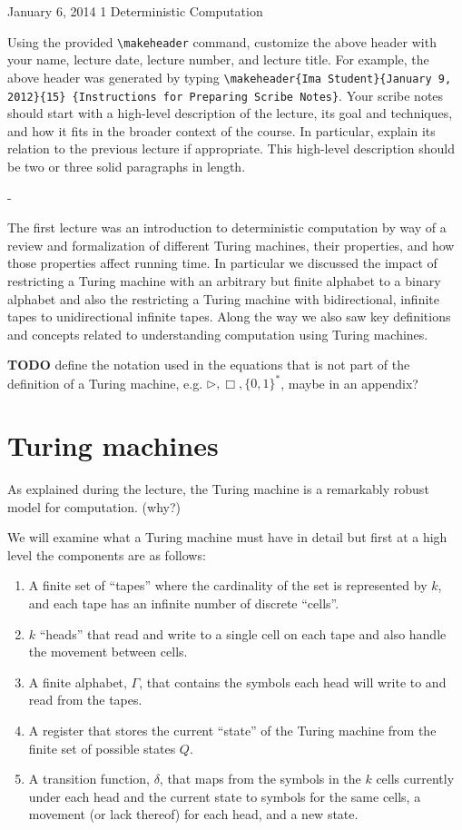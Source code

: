 \documentclass[usletter]{article}
\begin{document}
           {January 6, 2014}           %
           {1}                         %
           {Deterministic Computation} %

\noindent
Using the provided \verb|\makeheader| command,
customize the above header with your name,
lecture date, lecture number, and lecture title. For
example, the above header was generated by typing
\verb|\makeheader{Ima Student}{January 9, 2012}{15}|{\tt
\{Instructions for Preparing Scribe Notes\}}.  Your
scribe notes should start with a high-level description
of the lecture, its goal and techniques, and how it
fits in the broader context of the course. In
particular, explain its relation to the previous
lecture if appropriate.  This high-level description
should be two or three solid paragraphs in length.

-

The first lecture was an introduction to deterministic computation by way of a review and formalization of different Turing machines, their properties, and how those properties affect running time. In particular we discussed the impact of restricting a Turing machine with an arbitrary but finite alphabet to a binary alphabet and also the restricting a Turing machine with bidirectional, infinite tapes to unidirectional infinite tapes. Along the way we also saw key definitions and concepts related to understanding computation using Turing machines.

\textbf{TODO} define the notation used in the equations that is not part of the definition of a Turing machine, e.g. $\rhd, \Box, \{0,1\}^*$, maybe in an appendix?

\section{Turing machines}

As explained during the lecture, the Turing machine is a remarkably robust model for computation. (why?)

We will examine what a Turing machine must have in detail but first at a high level the components are as follows:

\begin{enumerate}
  \item A finite set of ``tapes''  where the cardinality of the set is represented by $k$, and each tape has an infinite number of discrete ``cells''.
  \item $k$ ``heads'' that read and write to a single cell on each tape and also handle the movement between cells.
  \item A finite alphabet, $\Gamma$, that contains the symbols each head will write to and read from the tapes.
  \item A register that stores the current ``state'' of the Turing machine from the finite set of possible states $Q$.
  \item A transition function, $\delta$, that maps from the symbols in the $k$ cells currently under each head and the current state to symbols for the same cells, a movement (or lack thereof) for each head, and a new state.
\end{enumerate}
\end{document}
